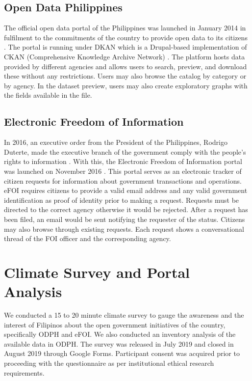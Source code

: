 \documentclass{sigchi}
\begin{document}
\subsection{Open Data Philippines}
The official open data portal of the Philippines was launched in January 2014 in fulfilment to the commitments of the country to provide open data to its citizens \cite{ODPH2015}. The portal is running under DKAN which is a Drupal-based implementation of CKAN (Comprehensive Knowledge Archive Network) \cite{dkan2019}. The platform hosts data provided by different agencies and allows users to search, preview, and download these without any restrictions. Users may also browse the catalog by category or by agency. In the dataset preview, users may also create exploratory graphs with the fields available in the file.


\subsection{Electronic Freedom of Information}
In 2016, an executive order from the President of the Philippines, Rodrigo Duterte, made the executive branch of the government comply with the people's rights to information \cite{duterte2016}. With this, the Electronic Freedom of Information portal was launched on November 2016 \cite{cigaral2016}. This portal serves as an electronic tracker of citizen requests for information about government transactions and operations. eFOI requires citizens to provide a valid email address and any valid government identification as proof of identity prior to making a request. Requests must be directed to the correct agency otherwise it would be rejected. After a request has been filed, an email would be sent notifying the requester of the status. Citizens may also browse through existing requests. Each request shows a conversational thread of the FOI officer and the corresponding agency. 

\section{Climate Survey and Portal Analysis}
We conducted a 15 to 20 minute climate survey to gauge the awareness and the interest of Filipinos about the open government initiatives of the country, specifically ODPH and eFOI. We also conducted an inventory analysis of the available data in ODPH. The survey was released in July 2019 and closed in August 2019 through Google Forms. Participant consent was acquired prior to proceeding with the questionnaire as per institutional ethical research requirements.
\end{document}
